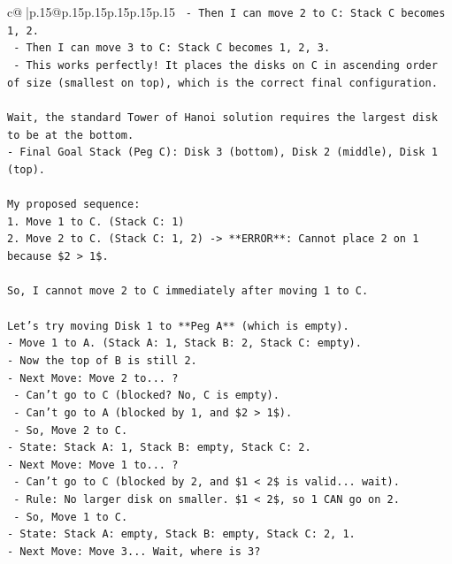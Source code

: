 \documentclass{article}
\begin{document}
{\begin{supertabular}{c@{$\;$}|p{.15\linewidth}@{}p{.15\linewidth}p{.15\linewidth}p{.15\linewidth}p{.15\linewidth}p{.15\linewidth}}
{{{\texttt{  {-} Then I can move 2 to C: Stack C becomes 1, 2.} \\
\texttt{  {-} Then I can move 3 to C: Stack C becomes 1, 2, 3.} \\
\texttt{  {-} This works perfectly! It places the disks on C in ascending order of size (smallest on top), which is the correct final configuration.} \\
\\ 
\texttt{Wait, the standard Tower of Hanoi solution requires the largest disk to be at the bottom.} \\
\texttt{{-} Final Goal Stack (Peg C): Disk 3 (bottom), Disk 2 (middle), Disk 1 (top).} \\
\\ 
\texttt{My proposed sequence:} \\
\texttt{1. Move 1 to C. (Stack C: 1)} \\
\texttt{2. Move 2 to C. (Stack C: 1, 2) {-}> **ERROR**: Cannot place 2 on 1 because \$2 > 1\$.} \\
\\ 
\texttt{So, I cannot move 2 to C immediately after moving 1 to C.} \\
\\ 
\texttt{Let's try moving Disk 1 to **Peg A** (which is empty).} \\
\texttt{{-} Move 1 to A. (Stack A: 1, Stack B: 2, Stack C: empty).} \\
\texttt{{-} Now the top of B is still 2.} \\
\texttt{{-} Next Move: Move 2 to... ?} \\
\texttt{  {-} Can't go to C (blocked? No, C is empty).} \\
\texttt{  {-} Can't go to A (blocked by 1, and \$2 > 1\$).} \\
\texttt{  {-} So, Move 2 to C.} \\
\texttt{{-} State: Stack A: 1, Stack B: empty, Stack C: 2.} \\
\texttt{{-} Next Move: Move 1 to... ?} \\
\texttt{  {-} Can't go to C (blocked by 2, and \$1 < 2\$ is valid... wait).} \\
\texttt{  {-} Rule: No larger disk on smaller. \$1 < 2\$, so 1 CAN go on 2.} \\
\texttt{  {-} So, Move 1 to C.} \\
\texttt{{-} State: Stack A: empty, Stack B: empty, Stack C: 2, 1.} \\
\texttt{{-} Next Move: Move 3... Wait, where is 3?} \\
}}}
\end{supertabular}}
\end{document}
